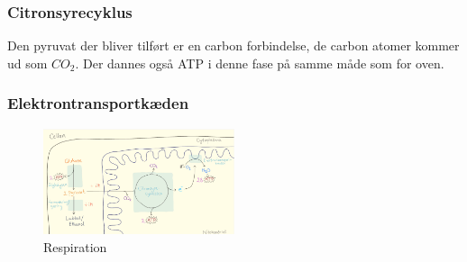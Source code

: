            \subsubsection{Citronsyrecyklus}
                Den pyruvat der bliver tilført er en carbon forbindelse, de carbon atomer kommer ud som \begin{math}CO_2\end{math}. Der dannes også ATP i denne fase på samme måde som for oven.

            \subsubsection{Elektrontransportkæden}
                \begin{figure}
                    \centering
                    \includegraphics[width=0.5\textwidth]{figurs/respiration.png}
                    \caption{Respiration}
                    \label{fig:respiration}
                \end{figure}
                \newpage
                
